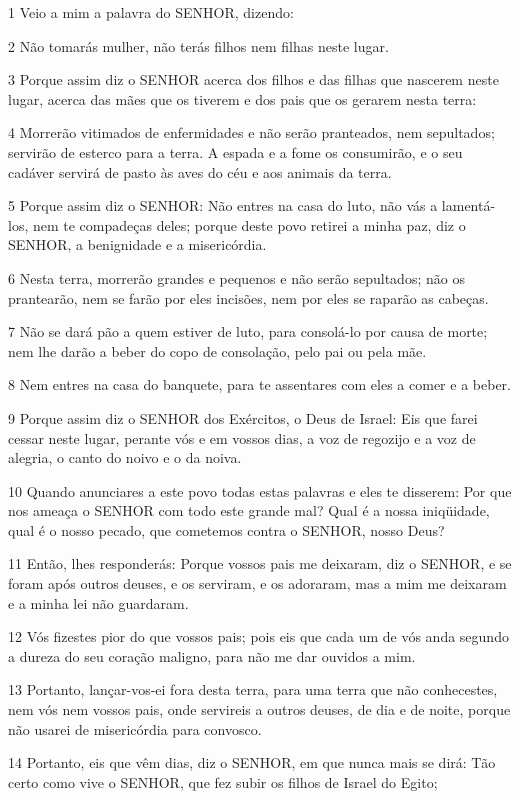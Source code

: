 \par 1 Veio a mim a palavra do SENHOR, dizendo:
\par 2 Não tomarás mulher, não terás filhos nem filhas neste lugar.
\par 3 Porque assim diz o SENHOR acerca dos filhos e das filhas que nascerem neste lugar, acerca das mães que os tiverem e dos pais que os gerarem nesta terra:
\par 4 Morrerão vitimados de enfermidades e não serão pranteados, nem sepultados; servirão de esterco para a terra. A espada e a fome os consumirão, e o seu cadáver servirá de pasto às aves do céu e aos animais da terra.
\par 5 Porque assim diz o SENHOR: Não entres na casa do luto, não vás a lamentá-los, nem te compadeças deles; porque deste povo retirei a minha paz, diz o SENHOR, a benignidade e a misericórdia.
\par 6 Nesta terra, morrerão grandes e pequenos e não serão sepultados; não os prantearão, nem se farão por eles incisões, nem por eles se raparão as cabeças.
\par 7 Não se dará pão a quem estiver de luto, para consolá-lo por causa de morte; nem lhe darão a beber do copo de consolação, pelo pai ou pela mãe.
\par 8 Nem entres na casa do banquete, para te assentares com eles a comer e a beber.
\par 9 Porque assim diz o SENHOR dos Exércitos, o Deus de Israel: Eis que farei cessar neste lugar, perante vós e em vossos dias, a voz de regozijo e a voz de alegria, o canto do noivo e o da noiva.
\par 10 Quando anunciares a este povo todas estas palavras e eles te disserem: Por que nos ameaça o SENHOR com todo este grande mal? Qual é a nossa iniqüidade, qual é o nosso pecado, que cometemos contra o SENHOR, nosso Deus?
\par 11 Então, lhes responderás: Porque vossos pais me deixaram, diz o SENHOR, e se foram após outros deuses, e os serviram, e os adoraram, mas a mim me deixaram e a minha lei não guardaram.
\par 12 Vós fizestes pior do que vossos pais; pois eis que cada um de vós anda segundo a dureza do seu coração maligno, para não me dar ouvidos a mim.
\par 13 Portanto, lançar-vos-ei fora desta terra, para uma terra que não conhecestes, nem vós nem vossos pais, onde servireis a outros deuses, de dia e de noite, porque não usarei de misericórdia para convosco.
\par 14 Portanto, eis que vêm dias, diz o SENHOR, em que nunca mais se dirá: Tão certo como vive o SENHOR, que fez subir os filhos de Israel do Egito;
